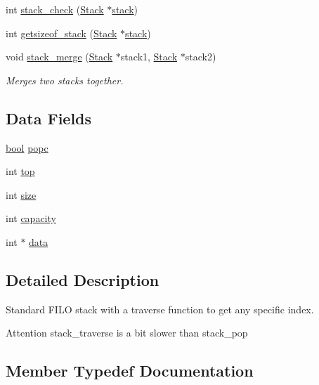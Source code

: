 \begin{DoxyCompactItemize}
int \hyperlink{structstack_ac5b24a79f9821527a6673b7582ae838b}{stack\+\_\+check} (\hyperlink{structstack_aa7883e8bf747b9dedec990b539df2cc0}{Stack} $\ast$\hyperlink{structstack}{stack})
\item 
int \hyperlink{structstack_a1f99bec6acb65ce01f2079dc1ea2c117}{getsizeof\+\_\+stack} (\hyperlink{structstack_aa7883e8bf747b9dedec990b539df2cc0}{Stack} $\ast$\hyperlink{structstack}{stack})
\item 
void \hyperlink{structstack_ac631668285b65b180672342a757df994}{stack\+\_\+merge} (\hyperlink{structstack_aa7883e8bf747b9dedec990b539df2cc0}{Stack} $\ast$stack1, \hyperlink{structstack_aa7883e8bf747b9dedec990b539df2cc0}{Stack} $\ast$stack2)
\begin{DoxyCompactList}\small\item\em Merges two stacks together. \end{DoxyCompactList}\end{DoxyCompactItemize}
\subsection*{Data Fields}
\begin{DoxyCompactItemize}
\item 
\hyperlink{_consts_8h_af6a258d8f3ee5206d682d799316314b1}{bool} \hyperlink{structstack_a2679cd033e6388e644c68ded9ce1fba4}{popc}
\item 
int \hyperlink{structstack_af93f4f37fc2ad9c37af4a715423b110c}{top}
\item 
int \hyperlink{structstack_a439227feff9d7f55384e8780cfc2eb82}{size}
\item 
int \hyperlink{structstack_adbe66a087ac3fd4a5b0566f64ca2d12b}{capacity}
\item 
int $\ast$ \hyperlink{structstack_ac103627c1ad15cbec2f22d0abe6d54b6}{data}
\end{DoxyCompactItemize}


\subsection{Detailed Description}
Standard F\+I\+LO stack with a traverse function to get any specific index. 

\begin{DoxyAttention}{Attention}
stack\+\_\+traverse is a bit slower than stack\+\_\+pop 
\end{DoxyAttention}


\subsection{Member Typedef Documentation}
\mbox{\label{structstack_aa7883e8bf747b9dedec990b539df2cc0}} 
